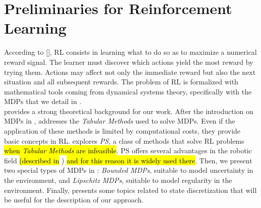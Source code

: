 \chapter{Preliminaries for Reinforcement Learning} \label{chap:rl}

According to [\cite{sutton2018reinforcement}], \acf{RL} consists in learning what to do so as to maximize a numerical reward signal. The learner must discover which actions yield the most reward by trying them. Actions may affect not only the immediate reward but also the next situation and all subsequent rewards. The problem of \ac{RL} is formalized with mathematical tools coming from dynamical systems theory, specifically with the \acf{MDPs} that we detail in .\\
\newline
{} provides a strong theoretical background for our work. After the introduction on \ac{MDPs} in ,  addresses the \emph{Tabular Methods} used to solve \ac{MDPs}. Even if the application of these methods is limited by computational costs, they provide basic concepts in \ac{RL}.  explores \emph{\acf{PS}}, a class of methods that solve \ac{RL} problems \hl{when \emph{Tabular Methods} are infeasible}. \ac{PS} offers several advantages in the robotic field \hl{(described in }) \hl{and for this reason it is widely used there}. Then, we present two special types of \ac{MDPs} in : \emph{Bounded \ac{MDPs}}, suitable to model uncertainty in the environment, and \emph{Lipschitz \ac{MDPs}}, suitable to model regularity in the environment. Finally,  presents some topics related to state discretization that will be useful for the description of our approach.

